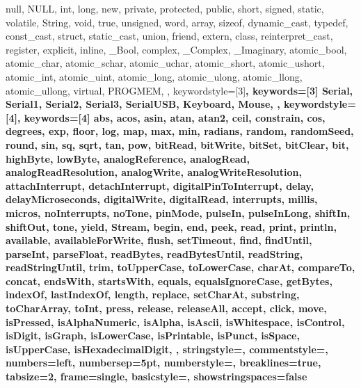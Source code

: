 {{                null, NULL, int, long, new, private, protected, public, short, 
                signed, static, volatile, String, void, true, unsigned, word, array, 
                sizeof, dynamic_cast, typedef, const_cast, struct, static_cast, union, 
                friend, extern, class, reinterpret_cast, register, explicit, inline, 
                _Bool, complex, _Complex, _Imaginary, atomic_bool, atomic_char, 
                atomic_schar, atomic_uchar, atomic_short, atomic_ushort, atomic_int, 
                atomic_uint, atomic_long, atomic_ulong, atomic_llong, atomic_ullong, 
                virtual, PROGMEM,
                },  
% 
%
  keywordstyle=[3]\bfseries\color{arduinoOrange},
  keywords=[3]{  %
                Serial, Serial1, Serial2, Serial3, SerialUSB, Keyboard, Mouse,
                },      
%
%
  keywordstyle=[4]\color{arduinoOrange},
  keywords=[4]{  %
                abs, acos, asin, atan, atan2, ceil, constrain, cos, degrees, exp, 
                floor, log, map, max, min, radians, random, randomSeed, round, sin, 
                sq, sqrt, tan, pow, bitRead, bitWrite, bitSet, bitClear, bit, 
                highByte, lowByte, analogReference, analogRead, 
                analogReadResolution, analogWrite, analogWriteResolution, 
                attachInterrupt, detachInterrupt, digitalPinToInterrupt, delay, 
                delayMicroseconds, digitalWrite, digitalRead, interrupts, millis, 
                micros, noInterrupts, noTone, pinMode, pulseIn, pulseInLong, shiftIn, 
                shiftOut, tone, yield, Stream, begin, end, peek, read, print, 
                println, available, availableForWrite, flush, setTimeout, find, 
                findUntil, parseInt, parseFloat, readBytes, readBytesUntil, readString, 
                readStringUntil, trim, toUpperCase, toLowerCase, charAt, compareTo, 
                concat, endsWith, startsWith, equals, equalsIgnoreCase, getBytes, 
                indexOf, lastIndexOf, length, replace, setCharAt, substring, 
                toCharArray, toInt, press, release, releaseAll, accept, click, move, 
                isPressed, isAlphaNumeric, isAlpha, isAscii, isWhitespace, isControl, 
                isDigit, isGraph, isLowerCase, isPrintable, isPunct, isSpace, 
                isUpperCase, isHexadecimalDigit, 
                },      
%
%
  stringstyle=\color{arduinoDarkBlue},    
  commentstyle=\color{arduinoGrey},    
%          
%   
   numbers=left,                    
  numbersep=5pt,                   
  numberstyle=\color{arduinoGrey},    
%
%
  breaklines=true,                    %
  tabsize=2,         
  frame=single,
  basicstyle=\ttfamily\footnotesize,
  showstringspaces=false
}

